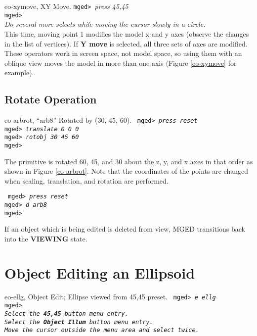 \mfig eo-xymove, XY Move.
\noindent
{\tt mged> }{\em press 45,45}\\
{\tt mged> }\\
{\em Do several more selects while moving the cursor slowly in a circle.}\\

   This time, moving point 1 modifies the model x and y axes (observe the
changes in the list of vertices).  If {\bf Y move} is selected, all
three sets of axes are modified.  These operators work in screen space,
not model space, so using them with an oblique view moves the model in
more than one axis (Figure \ref{eo-xymove} for example)..


\subsection{Rotate Operation}

\mfig eo-arbrot, ``arb8'' Rotated by (30, 45, 60).
\noindent
{\tt
mged> {\em press reset}\\
mged> {\em translate 0 0 0}\\
mged> {\em rotobj 30 45 60}\\
mged>\\
}

The primitive is rotated 60, 45, and 30 about the z, y, and x axes in
that order as shown in Figure \ref{eo-arbrot}.
Note that the coordinates of the points are changed when scaling,
translation, and rotation are performed.

\noindent
{\tt
mged> {\em press reset}\\
mged> {\em d arb8}\\
mged>\\
}

If an object which is being edited is deleted from view, MGED transitions
back into the {\bf VIEWING} state.

\section{Object Editing an Ellipsoid}

\mfig eo-ellg, Object Edit; Ellipse viewed from 45,45 preset.
\noindent
{\tt
mged> {\em e ellg}\\
mged>\\
{\em Select the {\bf 45,45} button menu entry.}\\
{\em Select the {\bf Object Illum} button menu entry.}\\
{\em Move the cursor outside the menu area and select twice.}\\
}

